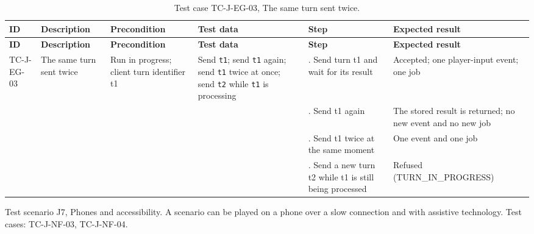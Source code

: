 {\footnotesize{}\renewcommand{\arraystretch}{1.1}
\begin{longtable}{|>{\raggedright\arraybackslash}p{}|>{\raggedright\arraybackslash}p{}|>{\raggedright\arraybackslash}p{}|>{\raggedright\arraybackslash}p{}|>{\raggedright\arraybackslash}p{}|>{\raggedright\arraybackslash}p{}|}
\caption{Test case TC-J-EG-03, The same turn sent twice.} \\
\hline
\textbf{ID} & \textbf{Description} & \textbf{Precondition} & \textbf{Test data} & \textbf{Step} & \textbf{Expected result} \\ \hline
\endfirsthead
\hline
\textbf{ID} & \textbf{Description} & \textbf{Precondition} & \textbf{Test data} & \textbf{Step} & \textbf{Expected result} \\ \hline
\endhead
TC-J-EG-03 & The same turn sent twice & Run in progress; client turn identifier t1 & Send \texttt{t1}; send \texttt{t1} again; send \texttt{t1} twice at once; send \texttt{t2} while \texttt{t1} is processing & 1. Send turn t1 and wait for its result & Accepted; one player-\allowbreak{}input event; one job \\ \cline{5-6}
 &  &  &  & 2. Send t1 again & The stored result is returned; no new event and no new job \\ \cline{5-6}
 &  &  &  & 3. Send t1 twice at the same moment & One event and one job \\ \cline{5-6}
 &  &  &  & 4. Send a new turn t2 while t1 is still being processed & Refused (TURN\_\allowbreak{}IN\_\allowbreak{}PROGRESS) \\ \hline
\end{longtable}
}

Test scenario J7, Phones and accessibility. A scenario can be played on a phone over a slow connection and with assistive technology. Test cases: TC-J-NF-03, TC-J-NF-04.

